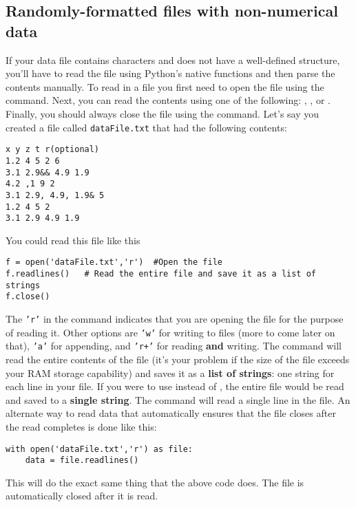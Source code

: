 \subsection*{Randomly-formatted files with non-numerical data}
If your data file contains characters and does not have a well-defined
structure, you'll have to read the file using Python's native
functions and then parse the contents manually.  To read in a file you
first need to open the file using the  command.  Next, you
can read the contents using one of the following: ,
, or .  Finally, you should always
close the file using the  command.  Let's say you created
a file called \texttt{dataFile.txt} that had the following contents:
\begin{Verbatim}
x y z t r(optional)
1.2 4 5 2 6
3.1 2.9&& 4.9 1.9
4.2 ,1 9 2
3.1 2.9, 4.9, 1.9& 5
1.2 4 5 2
3.1 2.9 4.9 1.9
\end{Verbatim}
You could read this file like this
\begin{Verbatim}
f = open('dataFile.txt','r')  #Open the file
f.readlines()   # Read the entire file and save it as a list of strings
f.close()
\end{Verbatim}
The \texttt{'r'} in the  command indicates that you are
opening the file for the purpose of reading it.  Other options are
\texttt{'w'} for writing to files (more to come later on that),
\texttt{'a'} for appending, and \texttt{'r+'} for reading {\bf and}
writing.  The  command will read the entire contents
of the file (it's your problem if the size of the file exceeds your
RAM storage capability) and saves it as a {\bf list of strings}: one
string for each line in your file.  If you were to use 
instead of , the entire file would be read and saved
to a {\bf single string}.  The  command will read a
single line in the file.  An alternate way to read data that
automatically ensures that the file closes after the read completes is
done like this:
\begin{Verbatim}
with open('dataFile.txt','r') as file:
    data = file.readlines()
\end{Verbatim}
This will do the exact same thing that the above code does.  The file
is automatically closed after it is read.

